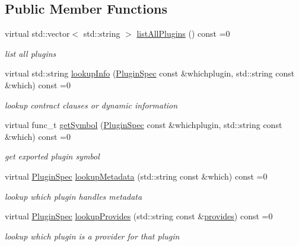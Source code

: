 \subsection*{Public Member Functions}
\begin{DoxyCompactItemize}
\item 
virtual std\+::vector$<$ std\+::string $>$ \hyperlink{classkdb_1_1tools_1_1PluginDatabase_adc1f43ccefdd7fc15a57db7571420642}{list\+All\+Plugins} () const =0
\begin{DoxyCompactList}\small\item\em list all plugins \end{DoxyCompactList}\item 
virtual std\+::string \hyperlink{classkdb_1_1tools_1_1PluginDatabase_ac0af2ec31a98f4176c19eaf34977abbe}{lookup\+Info} (\hyperlink{classkdb_1_1tools_1_1PluginSpec}{Plugin\+Spec} const \&whichplugin, std\+::string const \&which) const =0
\begin{DoxyCompactList}\small\item\em lookup contract clauses or dynamic information \end{DoxyCompactList}\item 
virtual func\+\_\+t \hyperlink{classkdb_1_1tools_1_1PluginDatabase_a87b5ef6ee66ce1ad46cc590a2b60b9fa}{get\+Symbol} (\hyperlink{classkdb_1_1tools_1_1PluginSpec}{Plugin\+Spec} const \&whichplugin, std\+::string const \&which) const =0
\begin{DoxyCompactList}\small\item\em get exported plugin symbol \end{DoxyCompactList}\item 
virtual \hyperlink{classkdb_1_1tools_1_1PluginSpec}{Plugin\+Spec} \hyperlink{classkdb_1_1tools_1_1PluginDatabase_a03a416f66d6525f46929e5a68d9db3f7}{lookup\+Metadata} (std\+::string const \&which) const =0
\begin{DoxyCompactList}\small\item\em lookup which plugin handles metadata \end{DoxyCompactList}\item 
virtual \hyperlink{classkdb_1_1tools_1_1PluginSpec}{Plugin\+Spec} \hyperlink{classkdb_1_1tools_1_1PluginDatabase_a43abe56a024218ecee48526ced699f05}{lookup\+Provides} (std\+::string const \&\hyperlink{classkdb_1_1tools_1_1PluginDatabase_afc91ff760616ee83c6afb70e5a2f0601a73ff10d6a07213c277db4326b3df6c4b}{provides}) const =0
\begin{DoxyCompactList}\small\item\em lookup which plugin is a provider for that plugin \end{DoxyCompactList}\item 

\end{DoxyCompactItemize}
